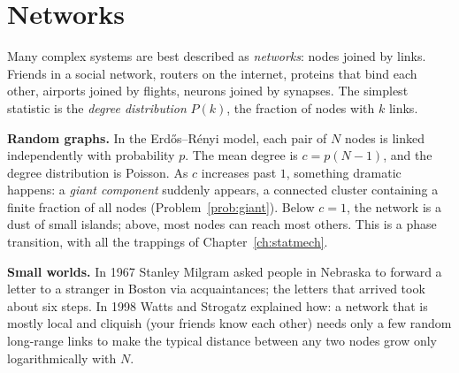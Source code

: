 \section{Networks}
\label{sec:networks}

Many complex systems are best described as \emph{networks}: nodes joined by links. Friends in a social network, routers on the internet, proteins that bind each other, airports joined by flights, neurons joined by synapses. The simplest statistic is the \emph{degree distribution} $P(k)$, the fraction of nodes with $k$ links.

\textbf{Random graphs.} In the Erd\H{o}s--R\'enyi model, each pair of $N$ nodes is linked independently with probability $p$. The mean degree is $c = p(N-1)$, and the degree distribution is Poisson. As $c$ increases past $1$, something dramatic happens: a \emph{giant component} suddenly appears, a connected cluster containing a finite fraction of all nodes (Problem~\ref{prob:giant}). Below $c=1$, the network is a dust of small islands; above, most nodes can reach most others. This is a phase transition, with all the trappings of Chapter~\ref{ch:statmech}.

\textbf{Small worlds.} In 1967 Stanley Milgram asked people in Nebraska to forward a letter to a stranger in Boston via acquaintances; the letters that arrived took about six steps. In 1998 Watts and Strogatz explained how: a network that is mostly local and cliquish (your friends know each other) needs only a few random long-range links to make the typical distance between any two nodes grow only logarithmically with $N$.

